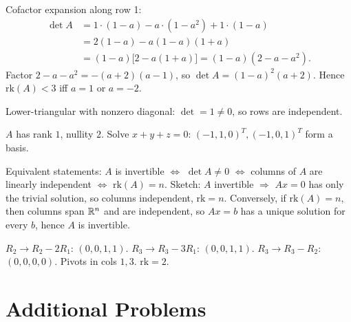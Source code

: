 \begin{solutions}
    \item Cofactor expansion along row 1:
    \[
\begin{aligned}
    \det A &= 1 \cdot (1 - a) - a \cdot (1 - a^{2}) + 1 \cdot (1 - a) \\
           &= 2(1 - a) - a(1 - a)(1 + a) \\
           &= (1 - a)\bigl[2 - a(1 + a)\bigr] = (1 - a)(2 - a - a^{2}).
    \end{aligned}
\]
    Factor $2 - a - a^{2} = -(a + 2)(a - 1)$, so $\det A = (1 - a)^{2}(a + 2)$. Hence $\mathrm{rk}(A) < 3$ iff $a = 1$ or $a = -2$.

    \item Lower-triangular with nonzero diagonal: $\det = 1 \neq 0$, so rows are independent.

    \item $A$ has rank $1$, nullity $2$. Solve $x + y + z = 0$: $(- 1, 1, 0)^{T}, (-1, 0, 1)^{T}$ form a basis.

    \item Equivalent statements: $A$ is invertible $\Leftrightarrow$ $\det A \neq 0$ $\Leftrightarrow$ columns of $A$ are linearly independent $\Leftrightarrow$ $\mathrm{rk}(A) = n$. Sketch: $A$ invertible $\Rightarrow$ $A x = 0$ has only the trivial solution, so columns independent, $\mathrm{rk} = n$. Conversely, if $\mathrm{rk}(A) = n$, then columns span $\mathbb{R}^{n}$ and are independent, so $A x = b$ has a unique solution for every $b$, hence $A$ is invertible.

    \item $R_{2} \to R_{2} - 2 R_{1}$: $(0, 0, 1, 1)$. $R_{3} \to R_{3} - 3 R_{1}$: $(0, 0, 1, 1)$. $R_{3} \to R_{3} - R_{2}$: $(0, 0, 0, 0)$. Pivots in cols $1, 3$. $\mathrm{rk} = 2$.
\end{solutions}

\section{Additional Problems}

